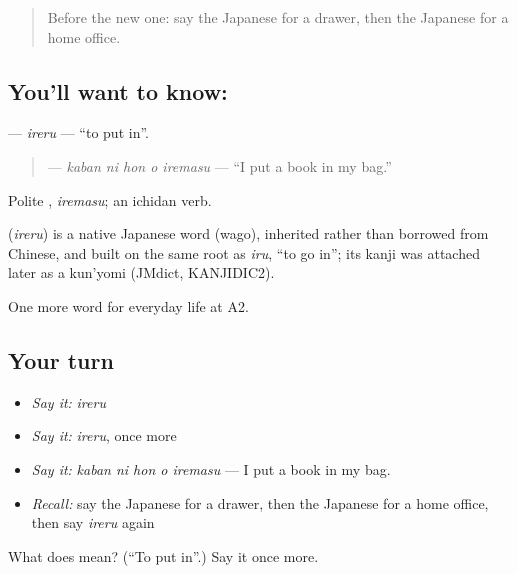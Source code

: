 \begin{quote}
Before the new one: say the Japanese for a drawer, then the Japanese for a home office.
\end{quote}

\subsection*{You'll want to know: }
\textbf{} — \emph{ireru} — \textquotedblleft{}to put in\textquotedblright{}.

\begin{quote}
\textbf{  } — \emph{kaban ni hon o iremasu} — \textquotedblleft{}I put a book in my bag.\textquotedblright{}
\end{quote}

Polite \textbf{}, \emph{iremasu}; an ichidan verb.

\begin{cousinweb}
\textbf{} (\emph{ireru}) is a native Japanese word (wago), inherited rather than borrowed from Chinese, and built on the same root as \emph{iru}, \textquotedblleft{}to go in\textquotedblright{}; its kanji was attached later as a kun'yomi (JMdict, KANJIDIC2).
\end{cousinweb}

\begin{grammarlens}[title={What you've built}]
One more word for everyday life at A2.
\end{grammarlens}

\subsection*{Your turn}
\begin{itemize}
\raggedright
  \item \emph{Say it:} \emph{ireru}
  \item \emph{Say it:} \emph{ireru}, once more
  \item \emph{Say it:} \emph{kaban ni hon o iremasu} — I put a book in my bag.
  \item \emph{Recall:} say the Japanese for a drawer, then the Japanese for a home office, then say \emph{ireru} again
\end{itemize}

\begin{tcolorbox}[breakable,colback=teal!4,colframe=teal!35!black,title={Before you move on}]
What does  mean? (\textquotedblleft{}To put in\textquotedblright{}.) Say it once more.
\end{tcolorbox}
